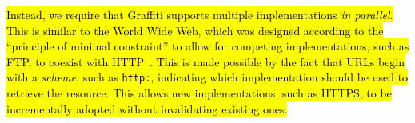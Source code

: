 \hl{%
Instead, we require that Graffiti supports multiple implementations
\emph{in parallel}.
This is similar to the World Wide Web, which was designed according to the
``principle of minimal constraint'' to allow for competing implementations,
such as FTP, to coexist with HTTP~{\cite{weavingtheweb}}.
This is made possible by the fact that URLs begin with a \emph{scheme},
such as \texttt{http:}, indicating which implementation should be
used to retrieve the resource.
This allows new implementations, such as HTTPS, to be
incrementally adopted without invalidating existing ones.
}%

